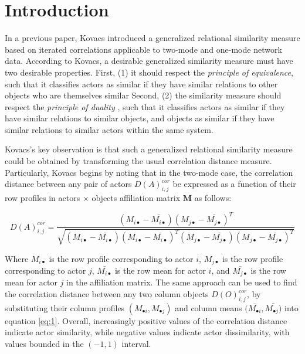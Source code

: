 \documentclass[a4paper,fleqn]{cas-sc}
\begin{document}
\section{Introduction}
In a previous paper, Kovacs \citeyearpar{kovacs2010} introduced a generalized relational similarity measure based on iterated correlations applicable to two-mode and one-mode network data. According to Kovacs, a desirable generalized similarity measure must have two desirable properties. First, (1) it should respect the \textit{principle of equivalence}, such that it classifies actors as similar if they have similar relations to other objects who are themselves similar Second, (2) the similarity measure should respect the \textit{principle of duality} \citep{breiger1974}, such that it classifies actors as similar if they have similar relations to similar objects, and objects as similar if they have similar relations to similar actors within the same system. 

Kovacs's key observation is that such a generalized relational similarity measure could be obtained by transforming the usual correlation distance measure. Particularly, Kovacs begins by noting that in the two-mode case, the correlation distance between any pair of actors $D(A)^{cor}_{i,j}$ be expressed as a function of their row profiles in actors $\times$ objects affiliation matrix $\mathbf{M}$ as follows:

\begin{equation}
    D(A)^{cor}_{i,j} = 
    \frac{
    (M_{i\bullet} - \bar{M_{i\bullet}})
    (M_{j\bullet} - \bar{M_{j\bullet}})^T
    }
    {
    \sqrt{
    (M_{i\bullet} - \bar{M_{i\bullet}})
    (M_{i\bullet} - \bar{M_{i\bullet}})^T
    (M_{j\bullet} - \bar{M_{j\bullet}})
    (M_{j\bullet} - \bar{M_{j\bullet}})^T
        }
    }
    \label{eq:1}
\end{equation}

Where $M_{i\bullet}$ is the row profile corresponding to actor $i$, $M_{j\bullet}$ is the row profile corresponding to actor $j$, $\bar{M_{i\bullet}}$ is the row mean for actor $i$, and $\bar{M_{j\bullet}}$ is the row mean for actor $j$ in the affiliation matrix. The same approach can be used to find the correlation distance between any two column objects $D(O)^{cor}_{i, j}$, by substituting their column profiles $(M_{\bullet i}, M_{\bullet j})$ and column means $(\bar{M_{\bullet i}}, \bar{M_{\bullet j})}$ into equation \ref{eq:1}. Overall, increasingly positive values of the correlation distance indicate actor similarity, while negative values  indicate actor dissimilarity, with values bounded in the $(-1, 1)$ interval.
\end{document}
